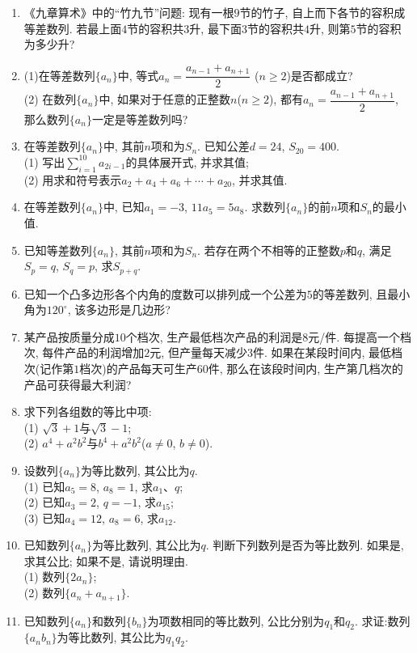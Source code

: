 \documentclass[10pt,a4paper]{article}
\begin{document}
\begin{enumerate}[1.]
\item 《九章算术》中的``竹九节''问题: 现有一根$9$节的竹子, 自上而下各节的容积成等差数列. 若最上面$4$节的容积共$3$升, 最下面$3$节的容积共$4$升, 则第$5$节的容积为多少升?
\item (1)在等差数列$\{a_n\}$中, 等式$a_n=\dfrac{a_{n-1}+a_{n+1}}2$
($n\ge 2$)是否都成立?\\
(2) 在数列$\{a_n\}$中, 如果对于任意的正整数$n$($n\ge 2$), 都有$a_n=\dfrac{a_{n-1}+a_{n+1}}2$, 那么数列$\{a_n\}$一定是等差数列吗?
\item 在等差数列$\{a_n\}$中, 其前$n$项和为$S_n$. 已知公差$d=24$, $S_{20}=400$.\\
(1) 写出$\displaystyle \sum_{i=1}^{10}a_{2i-1}$的具体展开式, 并求其值;\\
(2) 用求和符号表示$a_2+a_4+a_6+\cdots+a_{20}$, 并求其值.
\item 在等差数列$\{a_n\}$中, 已知$a_1=-3$, $11a_5=5a_8$. 求数列$\{a_n\}$的前$n$项和$S_n$的最小值.
\item 已知等差数列$\{a_n\}$, 其前$n$项和为$S_n$. 若存在两个不相等的正整数$p$和$q$, 满足$S_p=q$, $S_q=p$, 求$S_{p+q}$.
\item 已知一个凸多边形各个内角的度数可以排列成一个公差为$5$的等差数列, 且最小角为$120^\circ$, 该多边形是几边形?
\item 某产品按质量分成$10$个档次, 生产最低档次产品的利润是$8$元/件. 每提高一个档次, 每件产品的利润增加$2$元, 但产量每天减少$3$件. 如果在某段时间内, 最低档次(记作第$1$档次)的产品每天可生产$60$件, 那么在该段时间内, 生产第几档次的产品可获得最大利润?
\item 求下列各组数的等比中项:\\
(1) $\sqrt 3+1$与$\sqrt 3-1$;\\
(2) $a^4+a^2b^2$与$b^4+a^2b^2$($a\ne 0$, $b\ne 0$).
\item 设数列$\{a_n\}$为等比数列, 其公比为$q$.\\
(1) 已知$a_5=8$, $a_8=1$, 求$a_1$、$q$;\\
(2) 已知$a_3=2$, $q=-1$, 求$a_{15}$;\\
(3) 已知$a_4=12$, $a_8=6$, 求$a_{12}$.
\item 已知数列$\{a_n\}$为等比数列, 其公比为$q$. 判断下列数列是否为等比数列. 如果是, 求其公比; 如果不是, 请说明理由.\\
(1) 数列$\{2a_n\}$;\\
(2) 数列$\{a_n+a_{n+1}\}$.
\item 已知数列$\{a_n\}$和数列$\{b_n\}$为项数相同的等比数列, 公比分别为$q_1$和$q_2$. 求证:数列$\{a_nb_n\}$为等比数列, 其公比为$q_1q_2$.

\end{enumerate}
\end{document}
